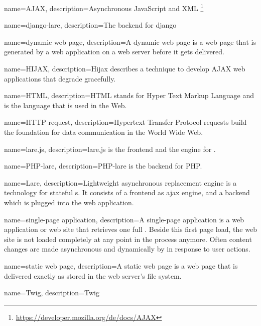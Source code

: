 \usepackage{glossaries}

{
  name=AJAX,
  description={Asynchronous JavaScript and XML \footnote{\url{https://developer.mozilla.org/de/docs/AJAX}}}
}

{
  name=django-lare,
  description={The \lare{} backend for django}
}

{
  name=dynamic web page,  
  description={A dynamic web page is a web page that is generated by a web application on a web server before it gets delivered.}
}

{
  name=HIJAX,
  description={Hijax describes a technique to develop AJAX web applications that degrade gracefully.}
}

{
  name=HTML,
  description={HTML stands for Hyper Text Markup Language and is the language that is used in the Web.}
}

{
  name=HTTP request,
  description={Hypertext Transfer Protocol requests build the foundation for data communication in the World Wide Web.}
}

{
  name=lare.js,
  description={lare.js is the \lare{} frontend and the \ajax{} engine for \lare{}.}
}

{
  name=PHP-lare,
  description={PHP-lare is the \lare{} backend for PHP.}
}

{
  name=Lare,
  description={Lightweight asynchronous replacement engine is a technology for stateful \singlePageApplication{}s.
  It consists of a \lare{} frontend as ajax engine, and a \lare{} backend which is plugged into the web application.}
}

{
  name=single-page application,
  description={A single-page application is a web application or web site that retrieves one full \webPage{}.
  Beside this first page load, the web site is not loaded completely at any point in the process anymore.
  Often content changes are made asynchronous and dynamically by \ajax{} in response to user actions.}
}

{
  name=static web page,
  description={A static web page is a web page that is delivered exactly as stored in the web server's file system.}
}

{
  name=Twig,
  description={Twig}
}

